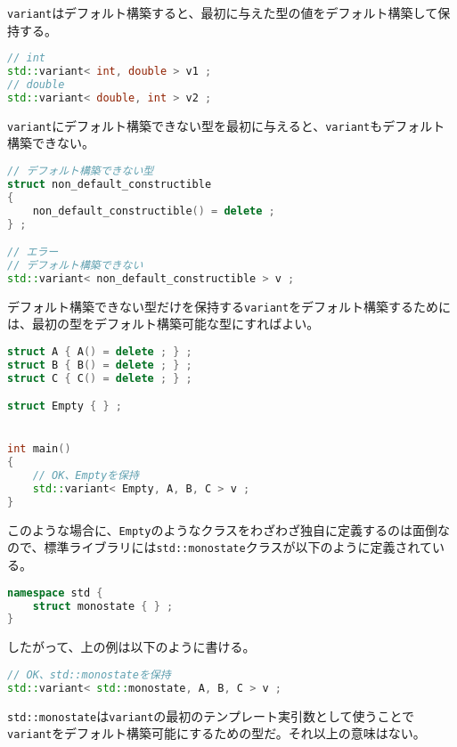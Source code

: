 \lstinline!variant!はデフォルト構築すると、最初に与えた型の値をデフォルト構築して保持する。

\begin{lstlisting}[language=C++]
// int
std::variant< int, double > v1 ;
// double
std::variant< double, int > v2 ;
\end{lstlisting}

\lstinline!variant!にデフォルト構築できない型を最初に与えると、\lstinline!variant!もデフォルト構築できない。

\begin{lstlisting}[language=C++]
// デフォルト構築できない型
struct non_default_constructible
{
    non_default_constructible() = delete ;
} ;

// エラー
// デフォルト構築できない
std::variant< non_default_constructible > v ;
\end{lstlisting}

デフォルト構築できない型だけを保持する\lstinline!variant!をデフォルト構築するためには、最初の型をデフォルト構築可能な型にすればよい。

\begin{lstlisting}[language=C++]
struct A { A() = delete ; } ;
struct B { B() = delete ; } ;
struct C { C() = delete ; } ;

struct Empty { } ;


int main()
{
    // OK、Emptyを保持
    std::variant< Empty, A, B, C > v ;
}
\end{lstlisting}

このような場合に、\lstinline!Empty!のようなクラスをわざわざ独自に定義するのは面倒なので、標準ライブラリには\lstinline!std::monostate!クラスが以下のように定義されている。

\begin{lstlisting}[language=C++]
namespace std {
    struct monostate { } ;
}
\end{lstlisting}

したがって、上の例は以下のように書ける。

\begin{lstlisting}[language=C++]
// OK、std::monostateを保持
std::variant< std::monostate, A, B, C > v ;
\end{lstlisting}

\lstinline!std::monostate!は\lstinline!variant!の最初のテンプレート実引数として使うことで\lstinline!variant!をデフォルト構築可能にするための型だ。それ以上の意味はない。

